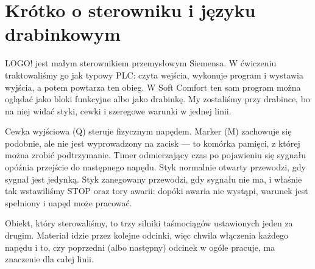 \section{Krótko o sterowniku i języku drabinkowym}

LOGO! jest małym sterownikiem przemysłowym Siemensa. W ćwiczeniu traktowaliśmy go jak typowy PLC: czyta wejścia, wykonuje program i wystawia wyjścia, a potem powtarza ten obieg. W Soft Comfort ten sam program można oglądać jako bloki funkcyjne albo jako drabinkę. My zostaliśmy przy drabince, bo na niej widać styki, cewki i szeregowe warunki w jednej linii.

Cewka wyjściowa (Q) steruje fizycznym napędem. Marker (M) zachowuje się podobnie, ale nie jest wyprowadzony na zacisk --- to komórka pamięci, z której można zrobić podtrzymanie. Timer odmierzający czas po pojawieniu się sygnału opóźnia przejście do następnego napędu. Styk normalnie otwarty przewodzi, gdy sygnał jest jedynką. Styk zanegowany przewodzi, gdy sygnału nie ma, i właśnie tak wstawiliśmy STOP oraz tory awarii: dopóki awaria nie wystąpi, warunek jest spełniony i napęd może pracować.

Obiekt, który sterowaliśmy, to trzy silniki taśmociągów ustawionych jeden za drugim. Materiał idzie przez kolejne odcinki, więc chwila włączenia każdego napędu i to, czy poprzedni (albo następny) odcinek w ogóle pracuje, ma znaczenie dla całej linii.
